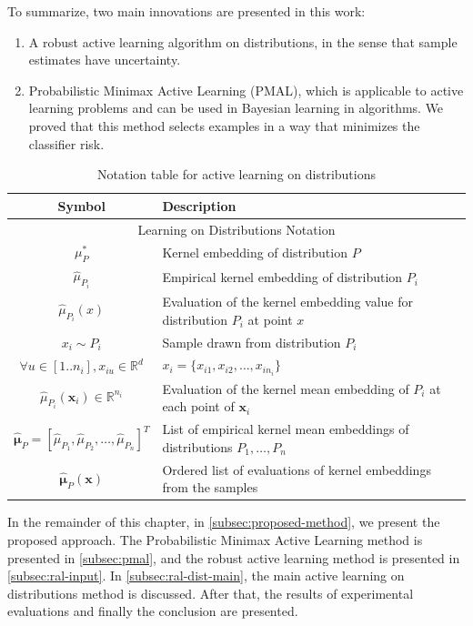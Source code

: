 	To summarize, two main innovations are presented in this work:
	\begin{enumerate}
		\item A robust active learning algorithm on distributions, in the sense that sample estimates have uncertainty.
		\item Probabilistic Minimax Active Learning (PMAL), which is applicable to active learning problems and can be used in Bayesian learning in algorithms. We proved that this method selects examples in a way that minimizes the classifier risk.
	\end{enumerate}
	
	\begin{table}[h!]
		\centering
		\caption{Notation table for active learning on distributions}
		\label{tab:dist-al-notation}
		\begin{tabular}{c|l}
			\hline
			Symbol & Description \\
			\hline
			\multicolumn{2}{c}{Learning on Distributions Notation} \\
			\hline
			$\mu^*_P$ & Kernel embedding of distribution $P$ \\
			$\hat{\mu}_{P_i}$ & Empirical kernel embedding of distribution $P_i$ \\
			$\hat{\mu}_{P_i}(x)$ & Evaluation of the kernel embedding value for distribution $P_i$ at point $x$ \\
			$x_i \sim P_i$ & Sample drawn from distribution $P_i$ \\
			$\forall u \in [1..n_i], x_{iu} \in \mathbb{R}^d$ & $x_i = \{x_{i1}, x_{i2}, \ldots, x_{i n_i}\}$ \\
			$\hat{\mu}_{P_i}(\mathbf{x}_i) \in \mathbb{R}^{n_i}$ & Evaluation of the kernel mean embedding of $P_i$ at each point of $\mathbf{x}_i$ \\
			$\hat{\boldsymbol{\mu}}_P = [\hat{\mu}_{P_1}, \hat{\mu}_{P_2}, \ldots, \hat{\mu}_{P_n}]^T$ & List of empirical kernel mean embeddings of distributions $P_1, \ldots, P_n$ \\
			$\hat{\boldsymbol{\mu}}_P(\mathbf{x})$ & Ordered list of evaluations of kernel embeddings from the samples \\
			\hline
		\end{tabular}
	\end{table}
	
	In the remainder of this chapter, in \ref{subsec:proposed-method}, we present the proposed approach. The Probabilistic Minimax Active Learning method is presented in \ref{subsec:pmal}, and the robust active learning method is presented in \ref{subsec:ral-input}. In \ref{subsec:ral-dist-main}, the main active learning on distributions method is discussed. After that, the results of experimental evaluations and finally the conclusion are presented.
	
